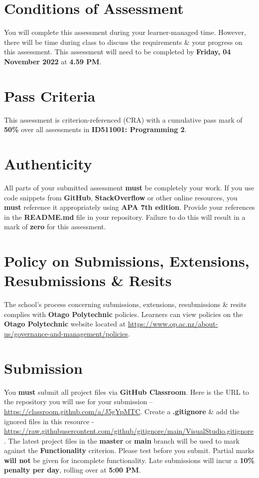 \documentclass{article}
\begin{document}
\section*{Conditions of Assessment}
You will complete this assessment during your learner-managed time. However, there will be time during class to discuss the requirements \& your progress on this assessment. This assessment will need to be completed by \textbf{Friday, 04 November 2022} at \textbf{4.59 PM}.

\section*{Pass Criteria}
This assessment is criterion-referenced (CRA) with a cumulative pass mark of \textbf{50\%} over all assessments in \textbf{ID511001: Programming 2}.

\section*{Authenticity}
All parts of your submitted assessment \textbf{must} be completely your work. If you use code snippets from \textbf{GitHub}, \textbf{StackOverflow} or other online resources, you \textbf{must} reference it appropriately using \textbf{APA 7th edition}. Provide your references in the \textbf{README.md} file in your repository. Failure to do this will result in a mark of \textbf{zero} for this assessment.

\section*{Policy on Submissions, Extensions, Resubmissions \& Resits}
The school's process concerning submissions, extensions, resubmissions \& resits complies with \textbf{Otago Polytechnic} policies. Learners can view policies on the \textbf{Otago Polytechnic} website located at \href{https://www.op.ac.nz/about-us/governance-and-management/policies}{https://www.op.ac.nz/about-us/governance-and-management/policies}.

\section*{Submission}
You \textbf{must} submit all project files via \textbf{GitHub Classroom}. Here is the URL to the repository you will use for your submission – \href{https://classroom.github.com/a/J5gYpMTC}{https://classroom.github.com/a/J5gYpMTC}.  Create a \textbf{.gitignore} \& add the ignored files in this resource - \href{https://raw.githubusercontent.com/github/gitignore/main/VisualStudio.gitignore}{https://raw.githubusercontent.com/github/gitignore/main/VisualStudio.gitignore}. The latest project files in the \textbf{master} or \textbf{main} branch will be used to mark against the \textbf{Functionality} criterion. Please test before you submit. Partial marks \textbf{will not} be given for incomplete functionality. Late submissions will incur a \textbf{10\% penalty per day}, rolling over at \textbf{5:00 PM}.
\end{document}
